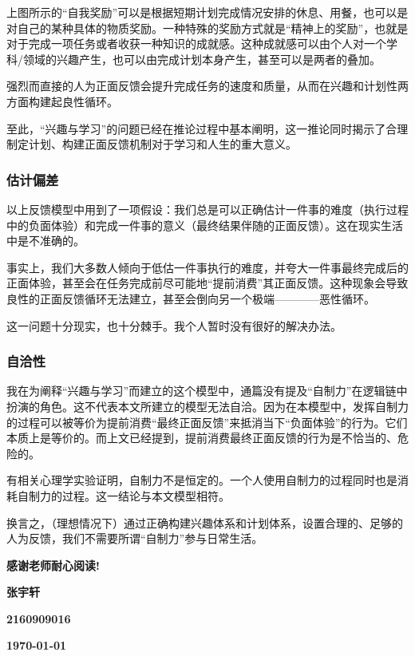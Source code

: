             上图所示的“自我奖励”可以是根据短期计划完成情况安排的休息、用餐，也可以是对自己的某种具体的物质奖励。一种特殊的奖励方式就是“精神上的奖励”，也就是对于完成一项任务或者收获一种知识的成就感。这种成就感可以由个人对一个学科/领域的兴趣产生，也可以由完成计划本身产生，甚至可以是两者的叠加。

            强烈而直接的人为正面反馈会提升完成任务的速度和质量，从而在兴趣和计划性两方面构建起良性循环。

            至此，“兴趣与学习”的问题已经在推论过程中基本阐明，这一推论同时揭示了合理制定计划、构建正面反馈机制对于学习和人生的重大意义。

        \subsubsection*{估计偏差}

            以上反馈模型中用到了一项假设：我们总是可以正确估计一件事的难度（执行过程中的负面体验）和完成一件事的意义（最终结果伴随的正面反馈）。这在现实生活中是不准确的。

            事实上，我们大多数人倾向于低估一件事执行的难度，并夸大一件事最终完成后的正面体验，甚至会在任务完成前尽可能地“提前消费”其正面反馈。这种现象会导致良性的正面反馈循环无法建立，甚至会倒向另一个极端————恶性循环。

            这一问题十分现实，也十分棘手。我个人暂时没有很好的解决办法。

        \subsubsection*{自洽性}

            我在为阐释“兴趣与学习”而建立的这个模型中，通篇没有提及“自制力”在逻辑链中扮演的角色。这不代表本文所建立的模型无法自洽。因为在本模型中，发挥自制力的过程可以被等价为提前消费“最终正面反馈”来抵消当下“负面体验”的行为。它们本质上是等价的。而上文已经提到，提前消费最终正面反馈的行为是不恰当的、危险的。

            有相关心理学实验证明，自制力不是恒定的。一个人使用自制力的过程同时也是消耗自制力的过程。这一结论与本文模型相符。

            换言之，（理想情况下）通过正确构建兴趣体系和计划体系，设置合理的、足够的人为反馈，我们不需要所谓“自制力”参与日常生活。

        \vspace{2cm}

        \hfill \textbf{感谢老师耐心阅读!}
 
        \hfill \textbf{张宇轩}
 
        \hfill \textbf{2160909016}
        
        \hfill \textbf{\today}